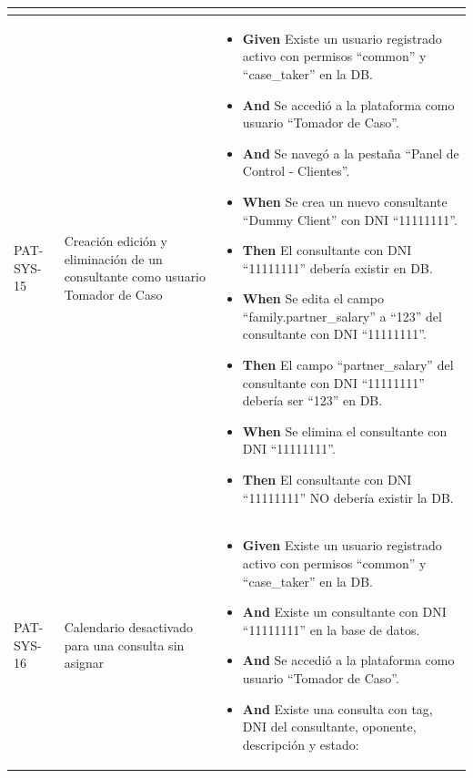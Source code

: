 \begin{longtable}{|p{1cm}|p{2.5cm}|p{12cm}|}
\begin{itemize}
    \end{itemize}
    \\
    \hline
    PAT-SYS-15 & Creación edición y eliminación de un consultante como usuario Tomador de Caso & 
    \begin{itemize}
        \item \textbf{Given} Existe un usuario registrado activo con permisos ``common'' y ``case\_taker'' en la DB.
        \item \textbf{And} Se accedió a la plataforma como usuario ``Tomador de Caso''.
        \item \textbf{And} Se navegó a la pestaña ``Panel de Control - Clientes''.
        \newline
        \item \textbf{When}  Se crea un nuevo consultante ``Dummy Client'' con DNI ``11111111''.
        \newline
        \item \textbf{Then} El consultante con DNI ``11111111'' deber\'ia existir en DB.
        \newline
        \item \textbf{When} Se edita el campo ``family.partner\_salary'' a ``123'' del consultante con DNI ``11111111''.
        \newline
        \item \textbf{Then} El campo ``partner\_salary'' del consultante con DNI ``11111111'' deber\'ia ser ``123'' en DB.
        \newline
        \item \textbf{When} Se elimina el consultante con DNI ``11111111''.
        \newline
        \item \textbf{Then} El consultante con DNI ``11111111'' NO deber\'ia existir la DB.
    \end{itemize}
    \\
     \hline
    PAT-SYS-16 & Calendario desactivado para una consulta sin asignar & 
    \begin{itemize}
        \item \textbf{Given} Existe un usuario registrado activo con permisos ``common'' y ``case\_taker'' en la DB.
        \item \textbf{And} Existe un consultante con DNI ``11111111'' en la base de datos.
        \item \textbf{And} Se accedió a la plataforma como usuario ``Tomador de Caso''.
        \item \textbf{And} Existe una consulta con tag, DNI del consultante, oponente, descripción y estado:

\end{itemize}
\end{longtable}
